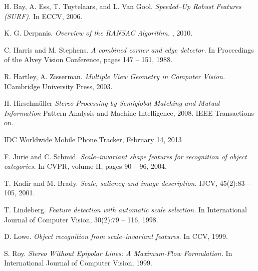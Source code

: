 
\def\bibname{Bibliography}
\begin{thebibliography}{99}
\addcontentsline{toc}{chapter}{\bibname}


  {\sc  H. Bay, A. Ess, T. Tuytelaars, and L. Van Gool.}
  \emph{Speeded–Up Robust Features (SURF).}
  In ECCV, 2006.

  {\sc K. G. Derpanis.} 
  \emph{Overview of the RANSAC Algorithm.}
  , 2010.

  {\sc C. Harris and M. Stephens.} 
  \emph{A combined corner and edge detector.}
  In Proceedings of the Alvey Vision Conference, pages 147 – 151, 1988.

  {\sc  R. Hartley, A. Zisserman.}
  \emph{Multiple View Geometry in Computer Vision.}
  ICambridge University Press, 2003.

  {\sc  H. Hirschmüller}
  \emph{Stereo Processing by Semiglobal Matching and Mutual Information}
  Pattern Analysis and Machine Intelligence, 2008. IEEE Transactions on.

  IDC Worldwide Mobile Phone Tracker, February 14, 2013

  {\sc F. Jurie and C. Schmid.} 
  \emph{Scale–invariant shape features for recognition of object categories.}
  In CVPR, volume II, pages 90 – 96, 2004.

  {\sc T. Kadir and M. Brady.} 
  \emph{Scale, saliency and image description.}
  IJCV, 45(2):83 – 105, 2001.
  
  {\sc T. Lindeberg.} 
  \emph{Feature detection with automatic scale selection.}
  In International Journal of Computer Vision, 30(2):79 – 116, 1998.

  {\sc D. Lowe.} 
  \emph{Object recognition from scale–invariant features.}
  In CCV, 1999.


  {\sc S. Roy.} 
  \emph{Stereo Without Epipolar Lines: A Maximum-Flow Formulation.}
  In International Journal of Computer Vision, 1999.



\end{thebibliography}
